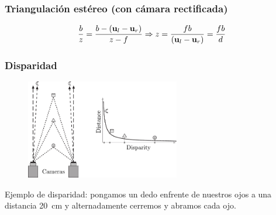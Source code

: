 \begin{frame}
	\frametitle{Triangulación estéreo (con cámara rectificada)}
	
    
   	\begin{figure}[!htb]
        \centering
        \hspace{1em}
	\end{figure}
	
	\begin{equation*}
		\frac{b}{z} = \frac{b - (\boldsymbol{\mathbf{u}}_{l} - \boldsymbol{\mathbf{u}}_{r})}{z-f} \Rightarrow z = \frac{fb}{(\boldsymbol{\mathbf{u}}_{l} - \boldsymbol{\mathbf{u}}_{r})}  = \frac{fb}{d}
	\end{equation*}
	
\end{frame}

\begin{frame}
	\frametitle{Disparidad}
	\footnotesize
	\begin{figure}[!h]
		\includegraphics[width=0.6\textwidth]{images/disparity.pdf}
	\end{figure}

    Ejemplo de disparidad: pongamos un dedo enfrente de nuestros ojos a una distancia \SI{20}{\centi\meter} y alternadamente cerremos y abramos cada ojo.

\end{frame}


